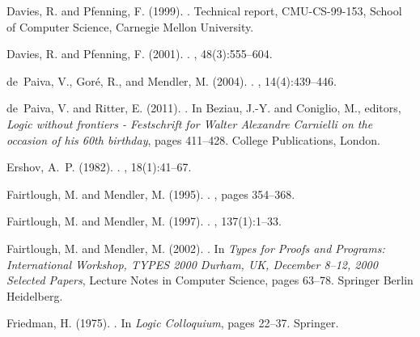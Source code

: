 \documentclass[a4paper]{amsart}
\begin{document}
\begin{thebibliography}{}
Davies, R. and Pfenning, F. (1999).
.
\newblock Technical report, CMU-CS-99-153, School of Computer Science, Carnegie
  Mellon University.

Davies, R. and Pfenning, F. (2001).
.
, 48(3):555--604.

de~Paiva, V., Gor{\'{e}}, R., and Mendler, M. (2004).
.
, 14(4):439--446.

de~Paiva, V. and Ritter, E. (2011).
.
\newblock In Beziau, J.-Y. and Coniglio, M., editors, {\em Logic without
  frontiers - Festschrift for Walter Alexandre Carnielli on the occasion of his
  60th birthday}, pages 411--428. College Publications, London.

Ershov, A.~P. (1982).
.
, 18(1):41--67.

Fairtlough, M. and Mendler, M. (1995).
.
, pages 354--368.

Fairtlough, M. and Mendler, M. (1997).
.
, 137(1):1--33.

Fairtlough, M. and Mendler, M. (2002).
.
\newblock In {\em Types for Proofs and Programs: International Workshop, TYPES
  2000 Durham, UK, December 8–12, 2000 Selected Papers}, Lecture Notes in
  Computer Science, pages 63--78. Springer Berlin Heidelberg.

Friedman, H. (1975).
.
\newblock In {\em Logic Colloquium}, pages 22--37. Springer.


\end{thebibliography}
\end{document}
